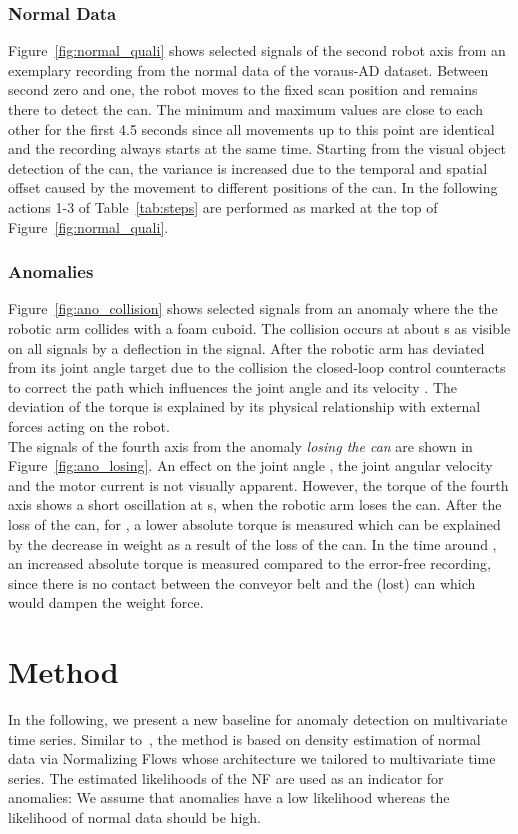 \documentclass[journal]{IEEEtran}
\newcommand\datasetname{voraus-AD}
\begin{document}
\subsubsection{Normal Data}
Figure~\ref{fig:normal_quali} shows selected signals of the second robot axis from an exemplary recording from the normal data of the \datasetname{} dataset.
Between second zero and one, the robot moves to the fixed scan position and remains there to detect the can.
The minimum and maximum values are close to each other for the first 4.5 seconds since all movements up to this point are identical and the recording always starts at the same time.
Starting from the visual object detection of the can, the variance is increased due to the temporal and spatial offset caused by the movement to different positions of the can.
In the following actions {1-3} of Table~\ref{tab:steps} are performed as marked at the top of Figure~\ref{fig:normal_quali}.

\subsubsection{Anomalies}
Figure~\ref{fig:ano_collision} shows selected signals from an anomaly where the the robotic arm collides with a foam cuboid.
The collision occurs at about  s as visible on all signals by a deflection in the signal.
After the robotic arm has deviated from its joint angle target due to the collision the closed-loop control counteracts to correct the path which influences the joint angle  and its velocity .
The deviation of the torque  is explained by its physical relationship with external forces acting on the robot.
\\The signals of the fourth axis from the anomaly \textit{losing the can} are shown in Figure~\ref{fig:ano_losing}.
An effect on the joint angle , the joint angular velocity  and the motor current  is not visually apparent.
However, the torque  of the fourth axis shows a short oscillation at  s, when the robotic arm loses the can.
After the loss of the can, for {}, a lower absolute torque is measured which can be explained by the decrease in weight as a result of the loss of the can.
In the time around {}, an increased absolute torque is measured compared to the error-free recording, since there is no contact between the conveyor belt and the (lost) can which would dampen the weight force.


\section{Method}
\label{nf_method}
In the following, we present a new baseline for anomaly detection on multivariate time series.
{Similar to~\cite{differnet, csflow, cflow}}, the method is based on density estimation of normal data via Normalizing Flows whose architecture we tailored to multivariate time series.
The estimated likelihoods of the NF are used as an indicator for anomalies:
We assume that anomalies have a low likelihood whereas the likelihood of normal data should be high.
\end{document}
